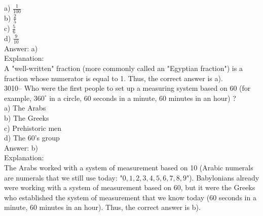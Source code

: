 \documentclass[letterpaper, 12pt]{article}
\begin{document}
a) $\frac{1}{100}$\\[2mm]
b) $\frac{2}{5}$\\[2mm]
c) $\frac{5}{6}$\\[2mm]
d) $\frac{9}{10}$\\[2mm]

Answer: a)\\

Explanation:\\
A "well-written" fraction (more commonly called an "Egyptian fraction") is a fraction whose numerator is equal to 1. Thus, the correct answer is a).\\



3010-- Who were the first people to set up a measuring system based on 60 (for example, $360^{\circ}$ in a circle, $60$ seconds in a minute, $60$ minutes in an hour) ?\\

a) The Arabs\\
b) The Greeks\\
c) Prehistoric men\\
d) The 60's group\\

Answer: b)\\

Explanation:\\
The Arabs worked with a system of measurement based on 10 (Arabic numerals are numerals that we still use today: "$0, 1, 2, 3, 4, 5, 6, 7, 8, 9$"). Babylonians already were working with a system of measurement based on 60, but it were the Greeks who established the system of measurement that we know today (60 seconds in a minute, 60 minutes in an hour). Thus, the correct answer is b).\\
\end{document}
